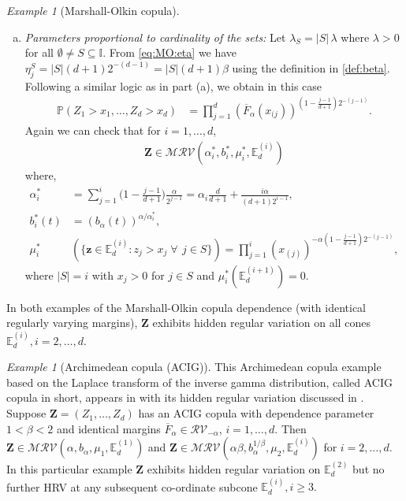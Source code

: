 \documentclass[aos]{imsart}
\numberwithin{equation}{section}
\theoremstyle{plain} %
\theoremstyle{remark}
\newtheorem{example}[theorem]{Example}
\newcommand{\E}{\mathbb{E}}
\renewcommand\P{\mathbb{P}}
\def\MRV{\mathcal{MRV}}
\def\RV{\mathcal{RV}}
\def\bZ{\boldsymbol Z}
\def\bz{\boldsymbol z}
\newcommand{\ov}{\overline}
\begin{document}
\begin{example}[Marshall-Olkin copula]
\begin{enumerate}[(a)]
\item \emph{Parameters proportional to cardinality of the sets:} Let $\lambda_S=|S|\,\lambda$ where $\lambda>0$ for all $\emptyset\neq S\subseteq \mathbb{I}$. From \eqref{eq:MO:eta} we have
    $\eta_j^S=|S|(d+1)2^{-(d-1)}= |S|(d+1)\beta$ using the definition in \eqref{def:beta}. Following a similar logic as in part (a), we obtain in this case
    \begin{align*}
       \P(Z_1 > x_1,\ldots, Z_d > x_d) & =  \prod_{j=1}^d \left(\overline{F}_{\alpha}(x_{(j})\right)^{\left(1-\frac{j-1}{d+1}\right)2^{-(j-1)}}.
    \end{align*}
Again we can check that for $i=1,\ldots, d$,
      \begin{align*}%
    \bZ\in \MRV({\alpha}_i^*, {b}_i^*, {\mu}^*_i,\E_d^{(i)})
\end{align*}
where,
\begin{equation}\label{eq:MO:alphakbkmukpropsize}
\begin{aligned}
  \alpha_i^* &  = \sum_{j=1}^i\Big(1-\frac{j-1}{d+1}\Big)\frac{\alpha}{2^{j-1}} = \alpha_i \frac d{d+1} +   \frac{i\alpha}{(d+1)2^{{i-1}}} ,\\
  b_i^*(t) &= (b_{\alpha}(t))^{\alpha/\alpha_i^*},\\
   \mu_i^* & \left( \{\bz \in \E_d^{(i)}:z_j>x_j \;\forall\,\ j\in S\}\right) =\prod_{j=1}^i \left({x}_{(j)}\right)^{-\alpha\left(1-\frac{j-1}{d+1}\right)2^{-(j-1)}},
\end{aligned}
\end{equation} where $|S|=i$ with $x_j>0$ for $j\in S$
 and $\mu_i^*(\E_d^{(i+1)})=0$.
\end{enumerate}

In both examples of the Marshall-Olkin copula dependence (with identical regularly varying margins), $\bZ$ exhibits hidden regular variation on all cones $\E_d^{(i)}, i=2,\ldots, d$.
\end{example}


\begin{example}[Archimedean  copula (ACIG)]\label{ex:cop:arch}
 This
 Archimedean copula example based on the Laplace transform of the inverse gamma distribution, called ACIG copula in short, appears in \cite{Hua:Joe:2011} with its hidden regular variation discussed in \cite[Example 4.4]{hua:joe:li:2014}. Suppose $\bZ=(Z_1,\ldots,Z_d)$ has an ACIG copula with dependence parameter
    $1<\beta<2$ and identical margins $\ov F_{\alpha}\in \RV_{-\alpha}$, $i=1,\ldots,d$. Then
    $\bZ\in \MRV(\alpha,b_{\alpha},\mu_1,\E_d^{(1)})$ and $\bZ\in\MRV(\alpha\beta,b_{\alpha}^{1/\beta},\mu_2,\E_d^{(i)})$  for $i=2,\ldots, d$.
 In this particular example $\bZ$ exhibits hidden regular variation on $\E_d^{(2)}$ but no further HRV at any subsequent co-ordinate subcone $\E_d^{(i)}, i \ge 3.$
\end{example}
\end{document}
